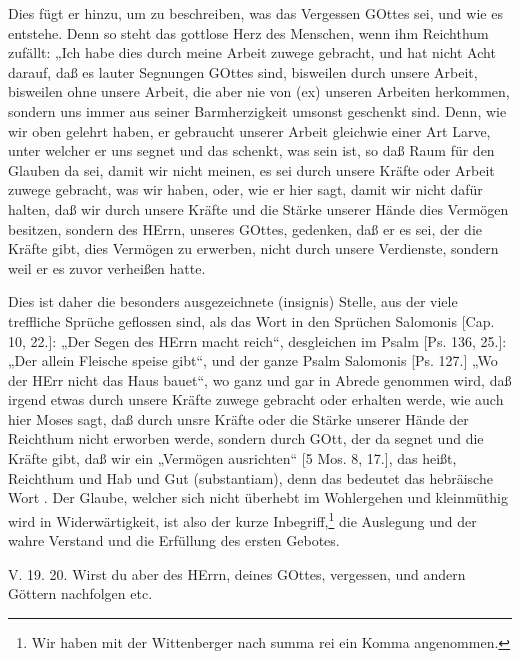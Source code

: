 Dies fügt er hinzu, um zu beschreiben, was das Vergessen GOttes sei, und wie es entstehe. Denn so steht das gottlose Herz des Menschen, wenn ihm Reichthum zufällt: „Ich habe dies durch meine Arbeit zuwege gebracht, und hat nicht Acht darauf, daß es lauter Segnungen GOttes sind, bisweilen durch unsere Arbeit, bisweilen ohne unsere Arbeit, die aber nie von (ex) unseren Arbeiten herkommen, sondern uns
immer aus seiner Barmherzigkeit umsonst geschenkt sind. Denn, wie wir oben gelehrt haben, er gebraucht unserer Arbeit gleichwie einer Art Larve, unter welcher er uns segnet und das schenkt, was sein ist, so daß Raum für den Glauben da sei, damit wir nicht meinen, es sei durch unsere Kräfte oder Arbeit zuwege gebracht, was wir haben, oder, wie er hier sagt, damit wir nicht dafür halten, daß wir durch unsere Kräfte und die Stärke unserer Hände dies Vermögen besitzen, sondern des HErrn, unseres GOttes, gedenken, daß er es sei, der die Kräfte gibt, dies Vermögen zu erwerben, nicht durch unsere Verdienste, sondern weil er es zuvor verheißen hatte.

Dies ist daher die besonders ausgezeichnete (insignis) Stelle, aus der viele treffliche Sprüche geflossen sind, als das Wort in den Sprüchen Salomonis [Cap. 10, 22.]: „Der Segen des HErrn macht reich“, desgleichen im Psalm [Ps. 136, 25.]: „Der allein Fleische speise gibt“, und der ganze Psalm Salomonis [Ps. 127.] „Wo der HErr nicht das Haus bauet“, wo ganz und gar in Abrede genommen wird, daß irgend etwas durch unsere Kräfte zuwege gebracht oder erhalten werde, wie auch hier Moses sagt, daß durch unsre Kräfte oder die Stärke unserer Hände der Reichthum nicht erworben werde, sondern durch GOtt, der da segnet und die Kräfte gibt, daß wir ein „Vermögen ausrichten“ [5 Mos. 8, 17.], das heißt, Reichthum und Hab und Gut (substantiam), denn das bedeutet das hebräische Wort . Der Glaube, welcher sich nicht überhebt im Wohlergehen und kleinmüthig wird in Widerwärtigkeit, ist also der kurze Inbegriff,\footnote{Wir haben mit der Wittenberger nach summa rei ein Komma angenommen.} die Auslegung und der wahre Verstand und die Erfüllung des ersten Gebotes.

\begin{schriftzitat}
V. 19. 20. Wirst du aber des HErrn, deines GOttes, vergessen, und andern Göttern nachfolgen etc.
\end{schriftzitat}

